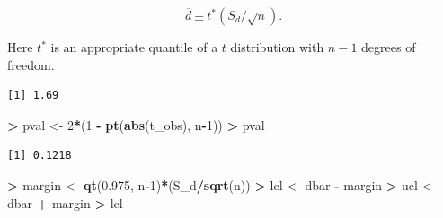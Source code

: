 \documentclass[]{krantz}
\makeatletter
\newenvironment{Shaded}{\begin{snugshade}}{\end{snugshade}}
\newcommand{\KeywordTok}[1]{\textcolor[rgb]{0.27,0.27,0.27}{\textbf{#1}}}
\newcommand{\DecValTok}[1]{\textcolor[rgb]{0.06,0.06,0.06}{#1}}
\newcommand{\FloatTok}[1]{\textcolor[rgb]{0.06,0.06,0.06}{#1}}
\newcommand{\StringTok}[1]{\textcolor[rgb]{0.5,0.5,0.5}{#1}}
\newcommand{\OperatorTok}[1]{\textcolor[rgb]{0.43,0.43,0.43}{\textbf{#1}}}
\newcommand{\NormalTok}[1]{#1}
\newenvironment{kframe}{%
\medskip{}
\setlength{\fboxsep}{.8em}
 \def\at@end@of@kframe{}%
 \ifinner\ifhmode%
  \def\at@end@of@kframe{\end{minipage}}%
  \begin{minipage}{\columnwidth}%
 \fi\fi%
 \def\FrameCommand##1{\hskip\@totalleftmargin \hskip-\fboxsep
 \colorbox{shadecolor}{##1}\hskip-\fboxsep
     \hskip-\linewidth \hskip-\@totalleftmargin \hskip\columnwidth}%
 \MakeFramed {\advance\hsize-\width
   \@totalleftmargin\z@ \linewidth\hsize
   \@setminipage}}%
 {\par\unskip\endMakeFramed%
 \at@end@of@kframe}
\renewenvironment{Shaded}{\begin{kframe}}{\end{kframe}}
\makeatother
\begin{document}
\begin{equation}
\overline d \pm t^* (S_d/\sqrt{n}).
\end{equation}

Here \(t^*\) is an appropriate quantile of a \(t\) distribution with
\(n-1\) degrees of freedom.

\begin{Shaded}
\end{Shaded}

\begin{verbatim}
[1] 1.69
\end{verbatim}

\begin{Shaded}
\begin{Highlighting}[]
\OperatorTok{>}\StringTok{ }\NormalTok{pval <-}\StringTok{ }\DecValTok{2}\OperatorTok{*}\NormalTok{(}\DecValTok{1} \OperatorTok{-}\StringTok{ }\KeywordTok{pt}\NormalTok{(}\KeywordTok{abs}\NormalTok{(t_obs), n}\OperatorTok{-}\DecValTok{1}\NormalTok{))}
\OperatorTok{>}\StringTok{ }\NormalTok{pval}
\end{Highlighting}
\end{Shaded}

\begin{verbatim}
[1] 0.1218
\end{verbatim}

\begin{Shaded}
\begin{Highlighting}[]
\OperatorTok{>}\StringTok{ }\NormalTok{margin <-}\StringTok{ }\KeywordTok{qt}\NormalTok{(}\FloatTok{0.975}\NormalTok{, n}\OperatorTok{-}\DecValTok{1}\NormalTok{)}\OperatorTok{*}\NormalTok{(S_d}\OperatorTok{/}\KeywordTok{sqrt}\NormalTok{(n))}
\OperatorTok{>}\StringTok{ }\NormalTok{lcl <-}\StringTok{ }\NormalTok{dbar }\OperatorTok{-}\StringTok{ }\NormalTok{margin}
\OperatorTok{>}\StringTok{ }\NormalTok{ucl <-}\StringTok{ }\NormalTok{dbar }\OperatorTok{+}\StringTok{ }\NormalTok{margin}
\OperatorTok{>}\StringTok{ }\NormalTok{lcl}
\end{Highlighting}
\end{Shaded}
\end{document}
